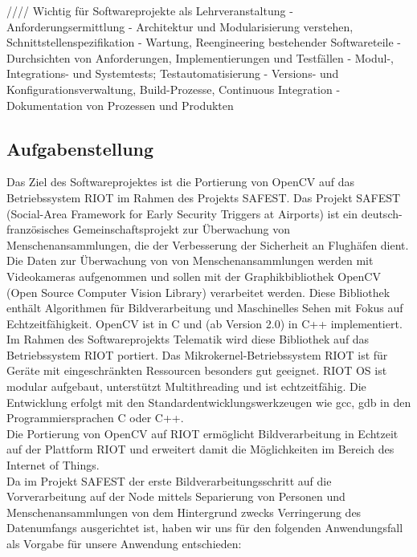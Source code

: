 \documentclass[10pt,a4paper]{article}
\begin{document}
//// Wichtig für Softwareprojekte als Lehrveranstaltung
- Anforderungsermittlung 
- Architektur und Modularisierung verstehen, Schnittstellenspezifikation
- Wartung, Reengineering bestehender Softwareteile
- Durchsichten von Anforderungen, Implementierungen und Testfällen
- Modul-, Integrations- und Systemtests; Testautomatisierung
- Versions- und Konfigurationsverwaltung, Build-Prozesse, Continuous Integration
- Dokumentation von Prozessen und Produkten


\subsection{Aufgabenstellung}

Das Ziel des Softwareprojektes ist die Portierung von OpenCV auf das Betriebssystem RIOT im Rahmen des Projekts SAFEST.
Das Projekt SAFEST (Social-Area Framework for Early Security Triggers at Airports) ist ein deutsch-französisches Gemeinschaftsprojekt zur Überwachung von Menschenansammlungen, die der Verbesserung der Sicherheit an Flughäfen dient. \\

Die Daten zur Überwachung von von Menschenansammlungen werden mit Videokameras aufgenommen und sollen mit der Graphikbibliothek OpenCV (Open Source Computer Vision Library) verarbeitet werden. Diese Bibliothek enthält Algorithmen für Bildverarbeitung und Maschinelles Sehen mit Fokus auf Echtzeitfähigkeit. OpenCV ist in C und (ab Version 2.0) in C++ implementiert. \\

Im Rahmen des Softwareprojekts Telematik wird diese Bibliothek auf das Betriebssystem RIOT portiert. Das Mikrokernel-Betriebssystem RIOT ist für Geräte mit eingeschränkten Ressourcen besonders gut geeignet. RIOT OS ist modular aufgebaut, unterstützt Multithreading und ist echtzeitfähig. Die Entwicklung erfolgt mit den Standardentwicklungswerkzeugen wie gcc, gdb in den Programmiersprachen C oder C++. \\

Die Portierung von OpenCV auf RIOT ermöglicht Bildverarbeitung in Echtzeit auf der Plattform RIOT und erweitert damit die Möglichkeiten im Bereich des Internet of Things. \\

Da im Projekt SAFEST der erste Bildverarbeitungsschritt auf die Vorverarbeitung auf der Node mittels Separierung von Personen und Menschenansammlungen von dem Hintergrund zwecks Verringerung des Datenumfangs ausgerichtet ist, haben wir uns für den folgenden Anwendungsfall als Vorgabe für unsere Anwendung entschieden: 
\end{document}
